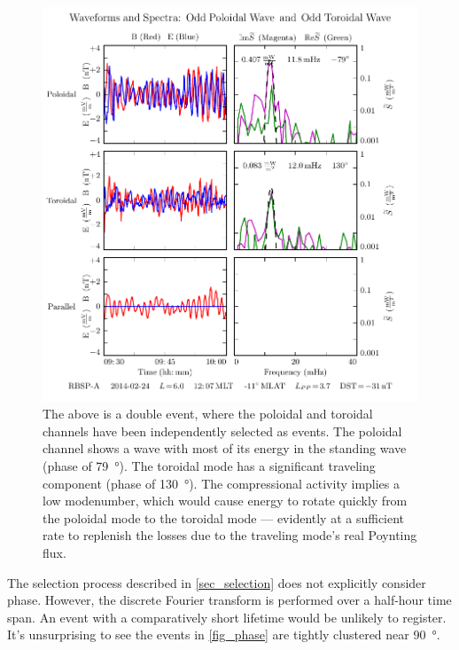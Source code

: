 \begin{figure}[!htb]
  \centering
  \includegraphics[width=\textwidth]{figures/sample_event_phase.pdf}
  \caption[Waveforms and Spectra for a Pc4 Event]{
    The above is a double event, where the poloidal and toroidal channels have
    been independently selected as events. The poloidal channel shows a wave
    with most of its energy in the standing wave (phase of \SI{79}{\degree}).
    The toroidal mode has a significant traveling component (phase of
    \SI{130}{\degree}). The compressional activity implies a low modenumber,
    which would cause energy to rotate quickly from the poloidal mode to the
    toroidal mode --- evidently at a sufficient rate to replenish the losses
    due to the traveling mode's real Poynting flux. 
  }
  \label{fig_sample_event_phase}
\end{figure}

The selection process described in \cref{sec_selection} does not explicitly
consider phase. However, the discrete Fourier transform is performed over a
half-hour time span. An event with a comparatively short lifetime would be
unlikely to register. It's unsurprising to see the events in \cref{fig_phase}
are tightly clustered near \SI{90}{\degree}. 

